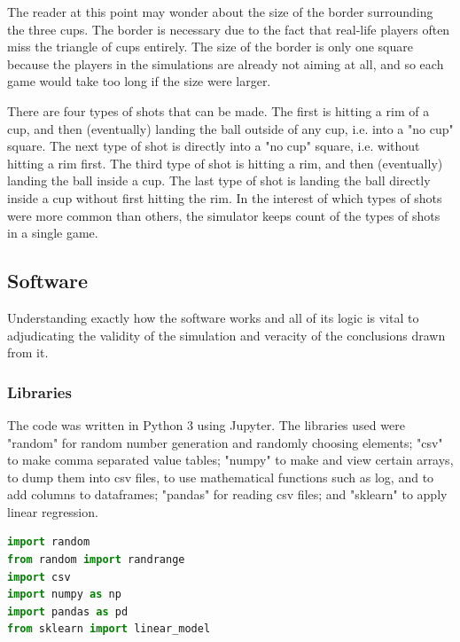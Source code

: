 \documentclass{article}
\begin{document}
The reader at this point may wonder about the size of the border surrounding the three cups. The border is necessary due to the fact that real-life players often miss the triangle of cups entirely. The size of the border is only one square because the players in the simulations are already not aiming at all, and so each game would take too long if the size were larger.

There are four types of shots that can be made. The first is hitting a rim of a cup, and then (eventually) landing the ball outside of any cup, i.e. into a "no cup" square. The next type of shot is directly into a "no cup" square, i.e. without hitting a rim first. The third type of shot is hitting a rim, and then (eventually) landing the ball inside a cup. The last type of shot is landing the ball directly inside a cup without first hitting the rim. In the interest of which types of shots were more common than others, the simulator keeps count of the types of shots in a single game.

\subsection{Software}
Understanding exactly how the software works and all of its logic is vital to adjudicating the validity of the simulation and veracity of the conclusions drawn from it.
\subsubsection{Libraries}
The code was written in Python 3 using Jupyter. The libraries used were "random" for random number generation and randomly choosing elements; "csv" to make comma separated value tables; "numpy" to make and view certain arrays, to dump them into csv files, to use mathematical functions such as log, and to add columns to dataframes; "pandas" for reading csv files; and "sklearn" to apply linear regression.
\begin{lstlisting}[language=Python]
import random
from random import randrange
import csv
import numpy as np
import pandas as pd
from sklearn import linear_model
\end{lstlisting}
\end{document}

